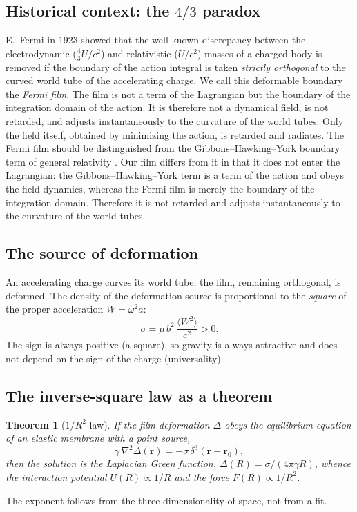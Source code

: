 \documentclass[12pt,a4paper]{article}
\newtheorem{theorem}{Theorem}
\begin{document}
\subsection{Historical context: the $4/3$ paradox}
E.~Fermi in 1923 \cite{fermi1923} showed that the well-known discrepancy
between the electrodynamic ($\tfrac{4}{3}U/c^2$) and relativistic ($U/c^2$)
masses of a charged body is removed if the boundary of the action integral is
taken \emph{strictly orthogonal} to the curved world tube of the accelerating
charge. We call this deformable boundary the \emph{Fermi film}. The film is not a
term of the Lagrangian but the boundary of the integration domain of the
action. It is therefore not a dynamical field, is not retarded, and adjusts
instantaneously to the curvature of the world tubes. Only the field itself,
obtained by minimizing the action, is retarded and radiates. The Fermi film should be distinguished from the Gibbons--Hawking--York
boundary term of general relativity \cite{hehl1995}. Our film differs from it in
that it does not enter the Lagrangian: the Gibbons--Hawking--York term is a term
of the action and obeys the field dynamics, whereas the Fermi film is merely the
boundary of the integration domain. Therefore it is not retarded and adjusts
instantaneously to the curvature of the world tubes.

\subsection{The source of deformation}
An accelerating charge curves its world tube; the film, remaining orthogonal,
is deformed. The density of the deformation source is proportional to the
\emph{square} of the proper acceleration $W=\omega^2 a$:
\begin{equation}
\sigma = \mu\, b^2\,\frac{\langle W^2\rangle}{c^2} > 0 .
\end{equation}
The sign is always positive (a square), so gravity is always attractive and
does not depend on the sign of the charge (universality).

\subsection{The inverse-square law as a theorem}
\begin{theorem}[$1/R^2$ law]
If the film deformation $\Delta$ obeys the equilibrium equation of an elastic
membrane with a point source,
\begin{equation}
\gamma\,\nabla^2\Delta(\mathbf r) = -\sigma\,\delta^3(\mathbf r-\mathbf r_0),
\end{equation}
then the solution is the Laplacian Green function, $\Delta(R)=\sigma/(4\pi\gamma R)$,
whence the interaction potential $U(R)\propto 1/R$ and the force $F(R)\propto 1/R^2$.
\end{theorem}
The exponent follows from the three-dimensionality of space, not from a fit.
\end{document}

